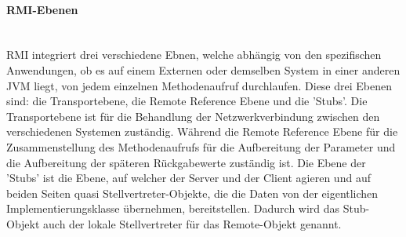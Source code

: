 \paragraph{RMI-Ebenen} \mbox{} \vspace{2mm} \\ 
RMI integriert drei verschiedene Ebnen, welche abhängig von den spezifischen Anwendungen, ob es auf einem Externen oder demselben System in einer anderen JVM liegt, von jedem einzelnen Methodenaufruf durchlaufen. Diese drei Ebenen sind: die Transportebene, die Remote Reference Ebene und die 'Stubs'. Die Transportebene ist für die Behandlung der Netzwerkverbindung zwischen den verschiedenen Systemen zuständig. Während die Remote Reference Ebene für die Zusammenstellung des Methodenaufrufs für die Aufbereitung der Parameter und die Aufbereitung der späteren Rückgabewerte zuständig ist. Die Ebene der 'Stubs' ist die Ebene, auf welcher der Server und der Client agieren und auf beiden Seiten quasi Stellvertreter-Objekte, die die Daten von der eigentlichen Implementierungsklasse übernehmen, bereitstellen. Dadurch wird das Stub-Objekt auch der lokale Stellvertreter für das Remote-Objekt genannt.